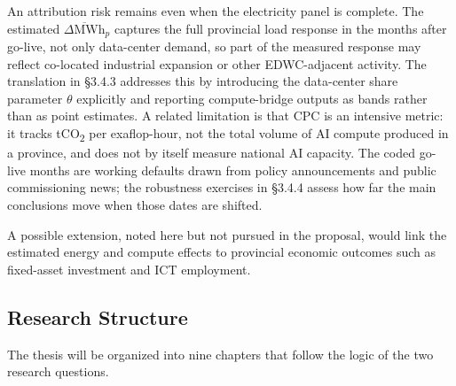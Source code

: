 \documentclass[12pt,a4paper]{article}
\begin{document}
An attribution risk remains even when the electricity panel is
complete. The estimated $\overline{\Delta\text{MWh}}_{p}$ captures the
full provincial load response in the months after go-live, not only
data-center demand, so part of the measured response may reflect
co-located industrial expansion or other EDWC-adjacent activity. The
translation in §3.4.3 addresses this by introducing the
data-center share parameter $\theta$ explicitly and reporting
compute-bridge outputs as bands rather than as point estimates. A
related limitation is that CPC is an intensive metric: it tracks
tCO\textsubscript{2} per exaflop-hour, not the total volume of AI
compute produced in a province, and does not by itself measure
national AI capacity. The coded go-live months are working defaults
drawn from policy announcements and public commissioning news; the
robustness exercises in §3.4.4 assess how far the main conclusions
move when those dates are shifted.

A possible extension, noted here but not pursued in the proposal,
would link the estimated energy and compute effects to provincial
economic outcomes such as fixed-asset investment and ICT employment.

\subsection{Research Structure}

The thesis will be organized into nine chapters that follow the
logic of the two research questions.
\end{document}
